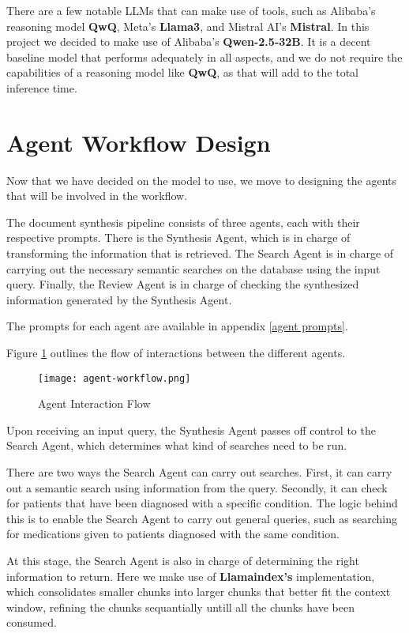 There are a few notable LLMs that can make use of tools, such as Alibaba's reasoning model \textbf{QwQ}, Meta's \textbf{Llama3}, and Mistral AI's \textbf{Mistral}. In this project we decided to make use of Alibaba's \textbf{Qwen-2.5-32B}. It is a decent baseline model that performs adequately in all aspects, and we do not require the capabilities of a reasoning model like \textbf{QwQ}, as that will add to the total inference time.

\section{Agent Workflow Design}

Now that we have decided on the model to use, we move to designing the agents that will be involved in the workflow.

The document synthesis pipeline consists of three agents, each with their respective prompts.
There is the Synthesis Agent, which is in charge of transforming the information that is retrieved. The Search Agent is in charge of carrying out the necessary semantic searches on the database using the input query. Finally, the Review Agent is in charge of checking the synthesized information generated by the Synthesis Agent.

The prompts for each agent are available in appendix \ref{agent prompts}.

Figure \ref{fig:AgentInteraction} outlines the flow of interactions between the different agents.

\begin{figure}
	\centering
	\texttt{[image: agent-workflow.png]}
	\caption{Agent Interaction Flow}
	\label{fig:AgentInteraction}
\end{figure}

Upon receiving an input query, the Synthesis Agent passes off control to the Search Agent, which determines what kind of searches need to be run.

There are two ways the Search Agent can carry out searches. First, it can carry out a semantic search using information from the query. Secondly, it can check for patients that have been diagnosed with a specific condition. The logic behind this is to enable the Search Agent to carry out general queries, such as searching for medications given to patients diagnosed with the same condition.

At this stage, the Search Agent is also in charge of determining the right information to return. Here we make use of \textbf{Llamaindex's} implementation,  which consolidates smaller chunks into larger chunks that better fit the context window, refining the chunks sequantially untill all the chunks have been consumed.

